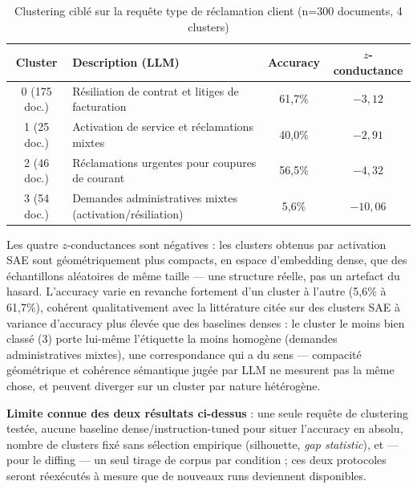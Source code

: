 \documentclass[11pt]{article}
\begin{document}
\begin{table}[h!]
\centering
\caption{Clustering ciblé sur la requête \og{}type de réclamation client\fg{} (n=300 documents, 4 clusters)}
\label{tab:clustering}
\vspace{0.4em}\small
\begin{tabular}{@{}clcc@{}}
\toprule
\textbf{Cluster} & \textbf{Description (LLM)} & \textbf{Accuracy} & \textbf{$z$-conductance} \\ \midrule
0 (175 doc.) & Résiliation de contrat et litiges de facturation & 61,7\% & $-3{,}12$ \\
1 (25 doc.) & Activation de service et réclamations mixtes & 40,0\% & $-2{,}91$ \\
2 (46 doc.) & Réclamations urgentes pour coupures de courant & 56,5\% & $-4{,}32$ \\
3 (54 doc.) & Demandes administratives mixtes (activation/résiliation) & 5,6\% & $-10{,}06$ \\
\bottomrule
\end{tabular}
\end{table}

Les quatre $z$-conductances sont négatives : les clusters obtenus par
activation SAE sont géométriquement plus compacts, en espace d'embedding
dense, que des échantillons aléatoires de même taille --- une structure
réelle, pas un artefact du hasard. L'accuracy varie en revanche fortement
d'un cluster à l'autre (5,6\% à 61,7\%), cohérent qualitativement avec la
littérature citée sur des clusters SAE à variance d'accuracy plus élevée que
des baselines denses : le cluster le moins bien classé (3) porte lui-même
l'étiquette la moins homogène (\og{}demandes administratives mixtes\fg{}),
une correspondance qui a du sens --- compacité géométrique et cohérence
sémantique jugée par LLM ne mesurent pas la même chose, et peuvent diverger
sur un cluster par nature hétérogène.

\textbf{Limite connue des deux résultats ci-dessus} : une seule requête de
clustering testée, aucune baseline dense/instruction-tuned pour situer
l'accuracy en absolu, nombre de clusters fixé sans sélection empirique
(silhouette, \emph{gap statistic}), et --- pour le diffing --- un seul
tirage de corpus par condition ; ces deux protocoles seront réexécutés à
mesure que de nouveaux runs deviennent disponibles.
\end{document}
